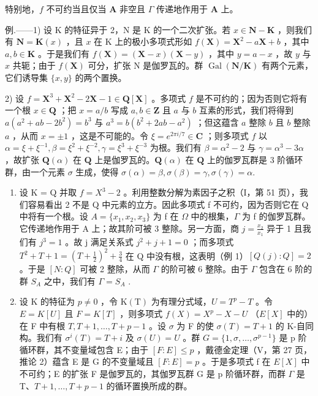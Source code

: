 特别地，\(f\) 不可约当且仅当 \(\mathbf{A}\) 非空且 \(\Gamma\) 传递地作用于 \(\mathbf{A}\) 上。

例.——1) 设 K 的特征异于 2，N 是 K 的一个二次扩张。若 \(x \in \mathbf{N} - \mathbf{K}\) ，则我们有 \(\mathbf{N} = \mathbf{K}(x)\) ，且 \(x\) 在 K 上的极小多项式形如 \(f(\mathbf{X}) = \mathbf{X}^2 - a\mathbf{X} + b\) ，其中 \(a, b \in \mathbf{K}\) 。于是我们有 \(f(\mathbf{X}) = (\mathbf{X} - x)(\mathbf{X} - y)\) ，其中 \(y = a - x\) ，故 \(y\) 与 \(x\) 共轭；由于 \(f(\mathbf{X})\) 可分，扩张 N 是伽罗瓦的。群 \(\operatorname{Gal}(\mathbf{N}/\mathbf{K})\) 有两个元素，它们诱导集 \(\{x, y\}\) 的两个置换。

2) 设 \(f = \mathbf{X}^3 + \mathbf{X}^2 - 2\mathbf{X} - 1 \in \mathbf{Q}[\mathbf{X}]\) 。多项式 \(f\) 是不可约的；因为否则它将有一个根 \(x \in \mathbf{Q}\) ；把 \(x = a / b\) 写成 \(a, b \in \mathbf{Z}\) 且 \(a\) 与 \(b\) 互素的形式，我们将得到 \(a(a^2 + ab - 2b^2) = b^3\) 与 \(a^3 = b(b^2 + 2ab - a^2)\) ；但这蕴含 \(a\) 整除 \(b\) 且 \(b\) 整除 \(a\) ，从而 \(x = \pm 1\) ，这是不可能的。令 \(\xi = e^{2\pi i / 7} \in \mathbf{C}\) ；则多项式 \(f\) 以 \(\alpha = \xi + \xi^{-1}, \beta = \xi^2 + \xi^{-2}, \gamma = \xi^3 + \xi^{-3}\) 为根。我们有 \(\beta = \alpha^2 - 2\) 与 \(\gamma = \alpha^3 - 3\alpha\) ，故扩张 \(\mathbf{Q}(\alpha)\) 在 \(\mathbf{Q}\) 上是伽罗瓦的。\(\mathbf{Q}(\alpha)\) 在 \(\mathbf{Q}\) 上的伽罗瓦群是 3 阶循环群，由一个元素 \(\sigma\) 生成，使得 \(\sigma(\alpha) = \beta, \sigma(\beta) = \gamma, \sigma(\gamma) = \alpha.\)

\begin{enumerate}
\def\labelenumi{\arabic{enumi})}
\setcounter{enumi}{2}
\item
  设 K = Q 并取 \(f = X^{3} - 2\) 。利用整数分解为素因子之积（I，第 51 页），我们容易看出 2 不是 Q 中元素的立方。因此多项式 f 不可约，因为否则它在 Q 中将有一个根。设 \(A = \{x_{1}, x_{2}, x_{3}\}\) 为 f 在 \(\Omega\) 中的根集，\(\Gamma\) 为 f 的伽罗瓦群。它传递地作用于 A 上；故其阶可被 3 整除。另一方面，商 \(j = \frac{x_{2}}{x_{1}}\) 异于 1 且我们有 \(j^{3} = 1\) 。故 j 满足关系式 \(j^{2} + j + 1 = 0\) ；而多项式 \(T^{2} + T + 1 = \left(T + \frac{1}{2}\right)^{2} + \frac{3}{4}\) 在 Q 中没有根，这表明（例 1）\([Q(j): Q] = 2\) 。于是 \([N: Q]\) 可被 2 整除，从而 \(\Gamma\) 的阶可被 6 整除。由于 \(\Gamma\) 包含在 6 阶的群 \(S_{A}\) 之中，我们有 \(\Gamma = S_{A}\) .
\item
  设 K 的特征为 \(p \neq 0\) ，令 \(\mathrm{K}(\mathrm{T})\) 为有理分式域，\(U = T^{p} - T\) 。令 \(E = K[U]\) 且 \(F = K[T]\) ，则多项式 \(f(X) = X^{p} - X - U\) （\(E[X]\) 中的）在 F 中有根 \(T, T + 1, \ldots, T + p - 1\) 。设 \(\sigma\) 为 F 的使 \(\sigma(T) = T + 1\) 的 K-自同构。我们有 \(\sigma^{i}(T) = T + i\) 及 \(\sigma(U) = U\) 。群 \(G = \{1, \sigma, \ldots, \sigma^{p-1}\}\) 是 p 阶循环群，其不变量域包含 E；由于 \([F: E] \leqslant p\) ，戴德金定理（V，第 27 页，推论 2）蕴含 E 是 G 的不变量域且 \([F: E] = p\) 。于是多项式 f 在 \(E[X]\) 中不可约；E 的扩张 F 是伽罗瓦的，其伽罗瓦群 G 是 p 阶循环群，而群 \(\Gamma\) 是 T、\(T + 1, \ldots, T + p - 1\) 的循环置换所成的群。
\end{enumerate}

